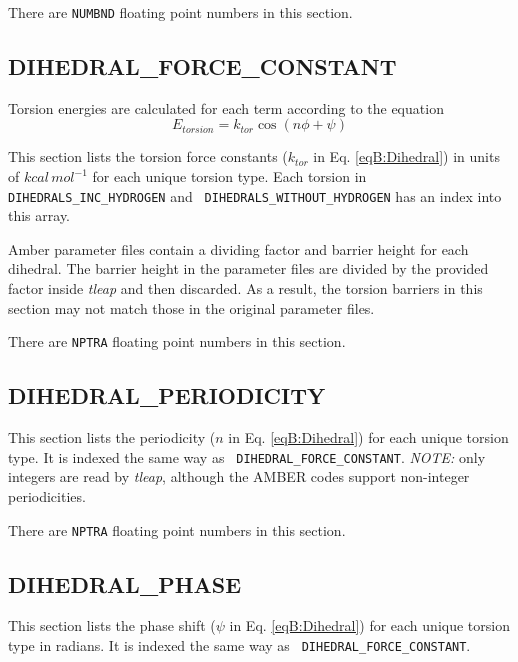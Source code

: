 
\noindent There are {\tt NUMBND} floating point numbers in this section.

\subsection*{DIHEDRAL\_FORCE\_CONSTANT}

Torsion energies are calculated for each term according to the equation
\begin{equation}
   E_{torsion} = k_{tor} \cos \left ( n \phi + \psi \right )
   \label{eqB:Dihedral}
\end{equation}

This section lists the torsion force constants ($k_{tor}$ in Eq.
\ref{eqB:Dihedral}) in units of $kcal\, mol^{-1}$ for each unique torsion type.
Each torsion in {\tt DIHEDRALS\_INC\_HYDROGEN} and {\tt
DIHEDRALS\_WITHOUT\_HYDROGEN} has an index into this array.

Amber parameter files contain a dividing factor and barrier height for each
dihedral. The barrier height in the parameter files are divided by the provided
factor inside \emph{tleap} and then discarded. As a result, the torsion barriers
in this section may not match those in the original parameter files.


\noindent There are {\tt NPTRA} floating point numbers in this section.

\subsection*{DIHEDRAL\_PERIODICITY}

This section lists the periodicity ($n$ in Eq. \ref{eqB:Dihedral}) for each
unique torsion type. It is indexed the same way as {\tt
DIHEDRAL\_FORCE\_CONSTANT}. \emph{NOTE:} only integers are read by
\emph{tleap}, although the AMBER codes support non-integer periodicities.


\noindent There are {\tt NPTRA} floating point numbers in this section.

\subsection*{DIHEDRAL\_PHASE}

This section lists the phase shift ($\psi$ in Eq. \ref{eqB:Dihedral}) for each
unique torsion type in radians. It is indexed the same way as {\tt
DIHEDRAL\_FORCE\_CONSTANT}.

